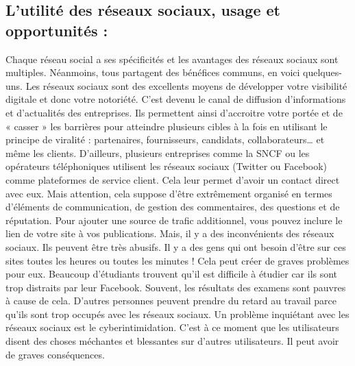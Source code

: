 \documentclass[12pt,a4paper,titlepage]{article}
\begin{document}
\subsection{L’utilité des réseaux sociaux, usage et opportunités :}
Chaque réseau social a ses spécificités et les avantages des réseaux sociaux sont
multiples. Néanmoins, tous partagent des bénéfices communs, en voici quelques-uns. \newline
Les réseaux sociaux sont des excellents moyens de développer votre visibilité digitale et donc
votre notoriété. C’est devenu le canal de diffusion d’informations et d’actualités des entreprises.
Ils permettent ainsi d’accroitre votre portée et de « casser » les barrières pour atteindre plusieurs
cibles à la fois en utilisant le principe de viralité : partenaires, fournisseurs, candidats,
collaborateurs… et même les clients. D’ailleurs, plusieurs entreprises comme la SNCF ou les
opérateurs téléphoniques utilisent les réseaux sociaux (Twitter ou Facebook) comme
plateformes de service client. Cela leur permet d’avoir un contact direct avec eux. Mais
attention, cela suppose d’être extrêmement organisé en termes d’éléments de communication,
de gestion des commentaires, des questions et de réputation. Pour ajouter une source de trafic
additionnel, vous pouvez inclure le lien de votre site à vos publications. \newline
Mais, il y a des inconvénients des réseaux sociaux. Ils peuvent être très abusifs. Il y a des gens
qui ont besoin d’être sur ces sites toutes les heures ou toutes les minutes ! Cela peut créer de
graves problèmes pour eux. Beaucoup d’étudiants trouvent qu’il est difficile à étudier car ils
sont trop distraits par leur Facebook. Souvent, les résultats des examens sont pauvres à cause
de cela. D’autres personnes peuvent prendre du retard au travail parce qu’ils sont trop occupés
avec les réseaux sociaux. Un problème inquiétant avec les réseaux sociaux est le
cyberintimidation. C’est à ce moment que les utilisateurs disent des choses méchantes et
blessantes sur d’autres utilisateurs. Il peut avoir de graves conséquences. \newline
\end{document}
